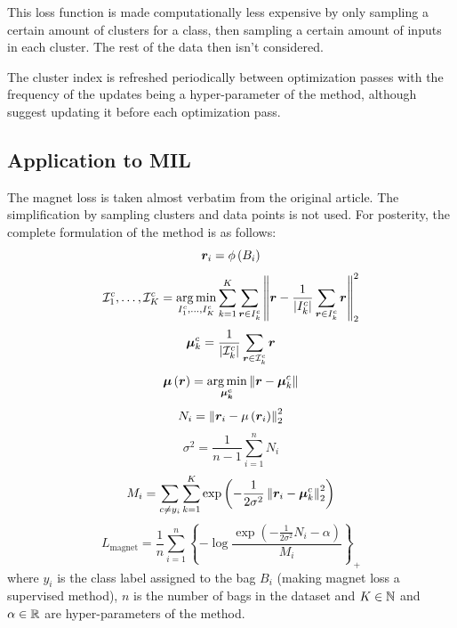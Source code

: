 This loss function is made computationally less expensive by only sampling a certain amount of clusters for a class, then sampling a certain amount of inputs in each cluster. The rest of the data then isn't considered.

The cluster index is refreshed periodically between optimization passes with the frequency of the updates being a hyper-parameter of the method, although \cite{rippel_metric_2015} suggest updating it before each optimization pass.

\subsection{Application to MIL}
The magnet loss is taken almost verbatim from the original article. The simplification by sampling clusters and data points is not used. For posterity, the complete formulation of the method is as follows:
\[ \bm{r}_i = \phi \left( B_i \right) \]
\[ \mathcal{I}_1^c, \dots, \mathcal{I}_K^c = \operatorname*{arg\,min}_{I_1^c, \dots, I_K^c} \sum_{k = 1}^K \sum_{\bm{r} \in I_k^c} \left\lVert \bm{r} - \frac{1}{\left\lvert I_k^c \right\rvert} \sum_{\bm{r} \in I_k^c} \bm{r} \right\rVert_2^2  \]
\[ \bm{\mu}_k^c = \frac{1}{\left\lvert \mathcal{I}_k^c \right\rvert} \sum_{\bm{r} \in \mathcal{I}_k^c} \bm{r} \]
\[ \bm{\mu} \left( \bm{r} \right) = \operatorname*{arg\,min}_{\bm{\mu_k^c}} \left\lVert \bm{r} - \bm{\mu}_k^c \right\rVert \]
\[ N_i = \left\lVert \bm{r}_i - \mu \left( \bm{r}_i \right) \right\rVert_2^2 \]
\[ \sigma^2 = \frac{1}{n - 1} \sum_{i = 1}^n N_i \]
\[ M_i = \sum_{c \neq y_i} \sum_{k = 1}^K \exp \left( - \frac{1}{2 \sigma^2} \left\lVert \bm{r}_i - \bm{\mu}_k^c \right\rVert_2^2 \right) \]
\[ L_\mathrm{magnet} = \frac{1}{n} \sum_{i = 1}^n \left\{ - \log \frac{\exp \left( - \frac{1}{2 \sigma^2} N_i - \alpha \right)}{M_i} \right\}_+ \]
where \( y_i \) is the class label assigned to the bag \( B_i \) (making magnet loss a supervised method), \( n \) is the number of bags in the dataset and \( K \in \mathbb{N} \) and \( \alpha \in \mathbb{R} \) are hyper-parameters of the method.
